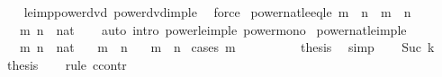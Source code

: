 \begin{isabellebody}
%
\isadelimproof
\ \ %
\endisadelimproof
%
\isatagproof
{}\isamarkupfalse%
\ le{\isacharunderscore}{\kern0pt}imp{\isacharunderscore}{\kern0pt}power{\isacharunderscore}{\kern0pt}dvd\ power{\isacharunderscore}{\kern0pt}dvd{\isacharunderscore}{\kern0pt}imp{\isacharunderscore}{\kern0pt}le\ \isamarkupfalse%
\ force%
\endisatagproof
{\isafoldproof}%
%
\isadelimproof
\isanewline
%
\endisadelimproof
\isanewline
{}\isamarkupfalse%
\ power{}{\isacharunderscore}{\kern0pt}nat{\isacharunderscore}{\kern0pt}le{\isacharunderscore}{\kern0pt}eq{\isacharunderscore}{\kern0pt}le{\isacharcolon}{\kern0pt}\ {\isachardoublequoteopen}m\ {\isasymle}\ n\ {\isasymlongleftrightarrow}\ m\ {\isasymle}\ n{\isachardoublequoteclose}\isanewline
\ \ \ m\ n\ {\isacharcolon}{\kern0pt}{\isacharcolon}{\kern0pt}\ nat\isanewline
%
\isadelimproof
\ \ %
\endisadelimproof
%
\isatagproof
{}\isamarkupfalse%
\ {\isacharparenleft}{\kern0pt}auto\ intro{\isacharcolon}{\kern0pt}\ power{}{\isacharunderscore}{\kern0pt}le{\isacharunderscore}{\kern0pt}imp{\isacharunderscore}{\kern0pt}le\ power{\isacharunderscore}{\kern0pt}mono{\isacharparenright}{\kern0pt}%
\endisatagproof
{\isafoldproof}%
%
\isadelimproof
\isanewline
%
\endisadelimproof
\isanewline
{}\isamarkupfalse%
\ power{}{\isacharunderscore}{\kern0pt}nat{\isacharunderscore}{\kern0pt}le{\isacharunderscore}{\kern0pt}imp{\isacharunderscore}{\kern0pt}le{\isacharcolon}{\kern0pt}\isanewline
\ \ \ m\ n\ {\isacharcolon}{\kern0pt}{\isacharcolon}{\kern0pt}\ nat\isanewline
\ \ \ {\isachardoublequoteopen}m\ {\isasymle}\ n{\isachardoublequoteclose}\isanewline
\ \ \ {\isachardoublequoteopen}m\ {\isasymle}\ n{\isachardoublequoteclose}\isanewline
%
\isadelimproof
%
\endisadelimproof
%
\isatagproof
{}\isamarkupfalse%
\ {\isacharparenleft}{\kern0pt}cases\ m{\isacharparenright}{\kern0pt}\isanewline
\ \ \isamarkupfalse%
\ {}\isanewline
\ \ \isamarkupfalse%
\ \isamarkupfalse%
\ {\isacharquery}{\kern0pt}thesis\ \isamarkupfalse%
\ simp\isanewline
{}\isamarkupfalse%
\isanewline
\ \ \isamarkupfalse%
\ {\isacharparenleft}{\kern0pt}Suc\ k{\isacharparenright}{\kern0pt}\isanewline
\ \ \isamarkupfalse%
\ {\isacharquery}{\kern0pt}thesis\isanewline
\ \ \isamarkupfalse%
\ {\isacharparenleft}{\kern0pt}rule\ ccontr{\isacharparenright}{\kern0pt}\isanewline

\end{isabellebody}
